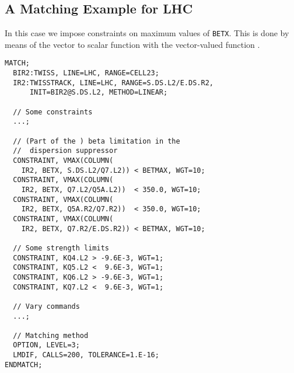 \subsection{A Matching Example for LHC}
In this case we impose constraints on maximum values of \texttt{BETX}.
This is done by means of the vector to scalar function
 with the vector-valued function
.
\begin{verbatim}
MATCH;
  BIR2:TWISS, LINE=LHC, RANGE=CELL23;
  IR2:TWISSTRACK, LINE=LHC, RANGE=S.DS.L2/E.DS.R2, 
      INIT=BIR2@S.DS.L2, METHOD=LINEAR;

  // Some constraints
  ...;

  // (Part of the ) beta limitation in the 
  //  dispersion suppressor
  CONSTRAINT, VMAX(COLUMN(
  	IR2, BETX, S.DS.L2/Q7.L2)) < BETMAX, WGT=10;
  CONSTRAINT, VMAX(COLUMN(
  	IR2, BETX, Q7.L2/Q5A.L2))  < 350.0, WGT=10;
  CONSTRAINT, VMAX(COLUMN(
  	IR2, BETX, Q5A.R2/Q7.R2))  < 350.0, WGT=10;
  CONSTRAINT, VMAX(COLUMN(
  	IR2, BETX, Q7.R2/E.DS.R2)) < BETMAX, WGT=10;

  // Some strength limits
  CONSTRAINT, KQ4.L2 > -9.6E-3, WGT=1;
  CONSTRAINT, KQ5.L2 <  9.6E-3, WGT=1;
  CONSTRAINT, KQ6.L2 > -9.6E-3, WGT=1;
  CONSTRAINT, KQ7.L2 <  9.6E-3, WGT=1;

  // Vary commands
  ...;

  // Matching method
  OPTION, LEVEL=3;
  LMDIF, CALLS=200, TOLERANCE=1.E-16;
ENDMATCH;
\end{verbatim}

